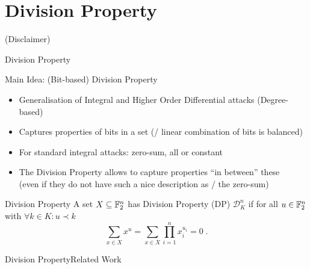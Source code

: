 \section{Division Property}
\begin{frame}[plain]
    \sectionpage
    \centering
    {\large
        (Disclaimer)
    }
    \vfill
\end{frame}

\begin{frame}{Division Property}
    \begin{block}{Main Idea: (Bit-based) Division Property}
        \begin{itemize}
            \item Generalisation of Integral and Higher Order Differential attacks \hfill (Degree-based)
            \item Captures properties of bits in a set \hfill (\eg/ linear combination of bits is balanced)
            \item For standard integral attacks: zero-sum, all or constant
            \item The Division Property allows to capture properties \enquote{in between} these\\
                  (even if they do not have such a nice description as \eg/ the zero-sum)
        \end{itemize}
    \end{block}
    \begin{block}{Division Property}
        A set $X \subseteq \mathbb{F}_2^n$ has Division Property (DP) $\mathcal{D}^n_K$ if for all $u \in \mathbb{F}_2^n$ with $\forall k \in K: u \prec k$
        \begin{equation*}
            \sum_{x \in X} x^u = \sum_{x \in X} \prod_{i=1}^n x_i^{u_i} = 0\;.
        \end{equation*}
    \end{block}
\end{frame}

\begin{frame}{Division Property}{Related Work}
    \begin{timeline}
    \end{timeline}
\end{frame}

